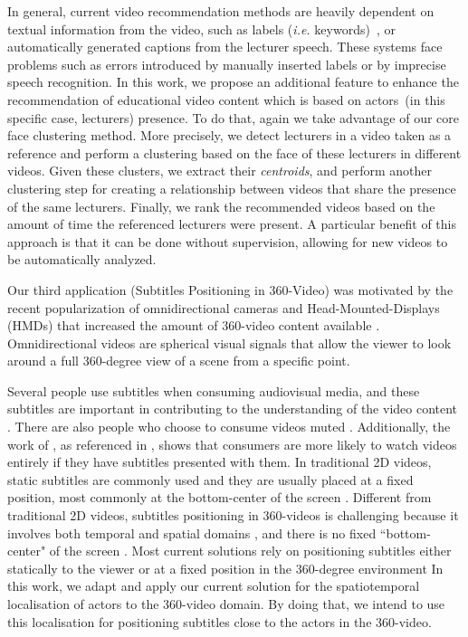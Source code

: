 In general, current video recommendation methods are heavily dependent on textual information from the video, such as labels (\textit{i.e.} keywords)~\cite{mahajan2015optimising,omisore2014personalized}, or automatically generated captions \cite{barrere2020utilizaccao} from the lecturer speech. These systems face problems such as errors introduced by manually inserted labels or by imprecise speech recognition.
In this work, we propose an additional feature to enhance the recommendation of educational video content which is based on actors~(in this specific case, lecturers) presence. To do that, again we take advantage of our core face clustering method. More precisely, we detect lecturers in a video taken as a reference and perform a clustering based on the face of these lecturers in different videos. Given these clusters, we extract their \textit{centroids}, and perform another clustering step for creating a relationship between videos that share the presence of the same lecturers. Finally, we rank the recommended videos based on the amount of time the referenced lecturers were present.
A particular benefit of this approach is that it can be done without supervision, allowing for new videos to be automatically analyzed.

Our third application (Subtitles Positioning in 360-Video) was motivated by the recent popularization of omnidirectional cameras and Head-Mounted-Displays (HMDs) that increased the amount of 360-video content available \cite{mendes2020authoring}. Omnidirectional videos are spherical visual signals that allow the viewer to look around a full 360-degree view of a scene from a specific point.

Several people use subtitles when consuming audiovisual media, and these subtitles are important in contributing to the understanding of the video content \cite{brown_subtitles_2017}. There are also people who choose to consume videos muted \cite{hughes_disruptive_2019}. Additionally, the work of \cite{hayati2011effect}, as referenced in \cite{hughes_disruptive_2019}, shows that consumers are more likely to watch videos entirely if they have subtitles presented with them. In traditional 2D videos, static subtitles are commonly used and they are usually placed at a fixed position, most commonly at the bottom-center of the screen \cite{rothe_dynamic_2018}.
Different from traditional 2D videos, subtitles positioning in 360-videos is challenging because it involves both temporal and spatial domains \cite{agullo2019making}, and there is no fixed ``bottom-center" of the screen \cite{brown_subtitles_2017}. Most current solutions rely on positioning subtitles either statically to the viewer or at a fixed position in the 360-degree environment %
In this work, we adapt and apply our current solution for the spatiotemporal localisation of actors to the 360-video domain. By doing that, we intend to use this localisation for positioning subtitles close to the actors in the 360-video.

